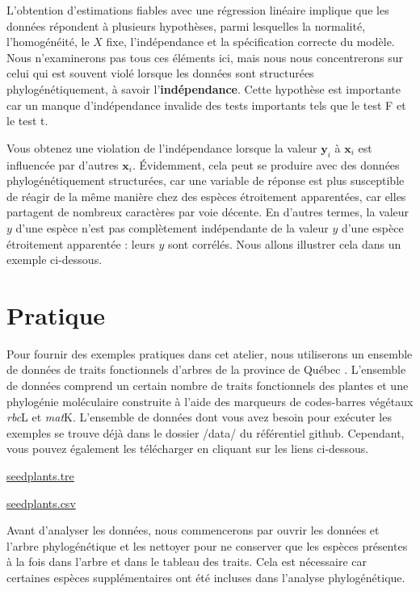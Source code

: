 \documentclass[
]{book}
\begin{document}
L'obtention d'estimations fiables avec une régression linéaire implique que les données répondent à plusieurs hypothèses, parmi lesquelles la normalité, l'homogénéité, le \(X\) fixe, l'indépendance et la spécification correcte du modèle. Nous n'examinerons pas tous ces éléments ici, mais nous nous concentrerons sur celui qui est souvent violé lorsque les données sont structurées phylogénétiquement, à savoir l'\textbf{indépendance}. Cette hypothèse est importante car un manque d'indépendance invalide des tests importants tels que le test F et le test t.

Vous obtenez une violation de l'indépendance lorsque la valeur \(\textbf{y}_i\) à \(\textbf{x}_i\) est influencée par d'autres \(\textbf{x}_i\). Évidemment, cela peut se produire avec des données phylogénétiquement structurées, car une variable de réponse est plus susceptible de réagir de la même manière chez des espèces étroitement apparentées, car elles partagent de nombreux caractères par voie décente. En d'autres termes, la valeur \(y\) d'une espèce n'est pas complètement indépendante de la valeur \(y\) d'une espèce étroitement apparentée : leurs \(y\) sont corrélés. Nous allons illustrer cela dans un exemple ci-dessous.

\section{Pratique}\label{pratique}

Pour fournir des exemples pratiques dans cet atelier, nous utiliserons un ensemble de données de traits fonctionnels d'arbres de la province de Québec \citep{paquette2015explaining}. L'ensemble de données comprend un certain nombre de traits fonctionnels des plantes et une phylogénie moléculaire construite à l'aide des marqueurs de codes-barres végétaux \emph{rbc}L et \emph{mat}K. L'ensemble de données dont vous avez besoin pour exécuter les exemples se trouve déjà dans le dossier /data/ du référentiel github. Cependant, vous pouvez également les télécharger en cliquant sur les liens ci-dessous.

\href{https://simjoly.github.io/ComparativeMethods-HalfDayWorkshop/data/seedplants.tre}{seedplants.tre}

\href{https://simjoly.github.io/ComparativeMethods-HalfDayWorkshop/data/seedplants.csv}{seedplants.csv}

Avant d'analyser les données, nous commencerons par ouvrir les données et l'arbre phylogénétique et les nettoyer pour ne conserver que les espèces présentes à la fois dans l'arbre et dans le tableau des traits. Cela est nécessaire car certaines espèces supplémentaires ont été incluses dans l'analyse phylogénétique.
\end{document}
